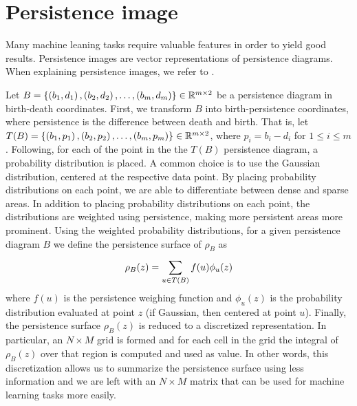 \section{Persistence image}
\label{sec:persistence-image}
Many machine leaning tasks require valuable features in order to yield good results. Persistence images \cite{adams2016persistence} are vector representations of persistence diagrams. When explaining persistence images, we refer to \cite{adams2016persistence}.

Let $B = \left\{\left(b_1, d_1\right), \left(b_2, d_2\right), \ldots, \left(b_m, d_m\right)\right\} \in \mathbb{R}^{m \times 2}$ be a persistence diagram in birth-death coordinates. First, we transform $B$ into birth-persistence coordinates, where persistence is the difference between death and birth. That is, let $T(B) = \left\{\left(b_1, p_1\right), \left(b_2, p_2\right), \ldots, \left(b_m, p_m\right)\right\} \in \mathbb{R}^{m \times 2}$, where $p_i = b_i - d_i$ for $1 \leq i \leq m$. Following, for each of the point in the the $T(B)$ persistence diagram, a probability distribution is placed. A common choice is to use the Gaussian distribution, centered at the respective data point. By placing probability distributions on each point, we are able to differentiate between dense and sparse areas. In addition to placing probability distributions on each point, the distributions are weighted using persistence, making more persistent areas more prominent. Using the weighted probability distributions, for a given persistence diagram $B$ we define the persistence surface of $\rho_B$ as
\begin{align}
    \rho_B(z) = \sum\limits_{u \in T(B)}^{} f(u) \phi_u(z)
\end{align}
where $f(u)$ is the persistence weighing function and $\phi_u(z)$ is the probability distribution evaluated at point $z$ (if Gaussian, then centered at point $u$). Finally, the persistence surface $\rho_B(z)$ is reduced to a discretized representation. In particular, an $N \times M$ grid is formed and for each cell in the grid the integral of $\rho_B(z)$ over that region is computed and used as value. In other words, this discretization allows us to summarize the persistence surface using less information and we are left with an $N \times M$ matrix that can be used for machine learning tasks more easily.


